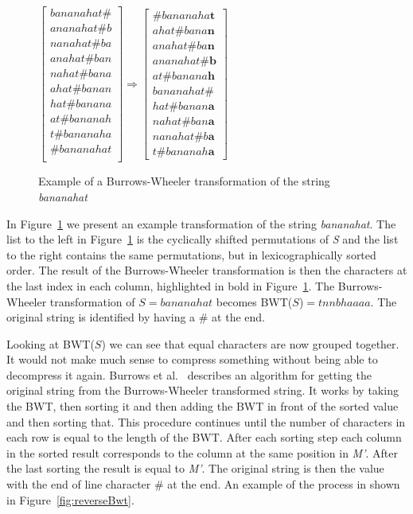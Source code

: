 \begin{figure}
\begin{center}
$\begin{bmatrix}
	bananahat\#\\
	ananahat\#b\\
	nanahat\#ba\\
	anahat\#ban\\
	nahat\#bana\\
	ahat\#banan\\
	hat\#banana\\
	at\#bananah\\
	t\#bananaha\\
	\#bananahat\\
\end{bmatrix} \Rightarrow
\begin{bmatrix}
	\#bananaha\textbf{t}\\
	ahat\#bana\textbf{n}\\
	anahat\#ba\textbf{n}\\
	ananahat\#\textbf{b}\\
	at\#banana\textbf{h}\\
	bananahat\#\\
	hat\#banan\textbf{a}\\
	nahat\#ban\textbf{a}\\
	nanahat\#b\textbf{a}\\
	t\#bananah\textbf{a}
\end{bmatrix}$
\end{center}
\caption{Example of a Burrows-Wheeler transformation of the string \textit{bananahat}}
\label{fig:BWTExample}
\end{figure}
In Figure~\ref{fig:BWTExample} we present an example transformation of the string \textit{bananahat}.
The list to the left in Figure~\ref{fig:BWTExample} is the cyclically shifted permutations of \textit{S} and the list to the right contains the same permutations, but in lexicographically sorted order.
The result of the Burrows-Wheeler transformation is then the characters at the last index in each column, highlighted in bold in Figure~\ref{fig:BWTExample}.
The Burrows-Wheeler transformation of $S=bananahat$ becomes BWT($S$)$ = tnnbhaaaa$.
The original string is identified by having a \# at the end.

Looking at BWT($S$) we can see that equal characters are now grouped together.
It would not make much sense to compress something without being able to decompress it again.
Burrows et al.~ describes an algorithm for getting the original string from the Burrows-Wheeler transformed string.
It works by taking the BWT, then sorting it and then adding the BWT in front of the sorted value and then sorting that. 
This procedure continues until the number of characters in each row is equal to the length of the BWT. 
After each sorting step each column in the sorted result corresponds to the column at the same position in \textit{M'}. 
After the last sorting the result is equal to \textit{M'}.
The original string is then the value with the end of line character \# at the end. 
An example of the process in shown in Figure~\ref{fig:reverseBwt}.


